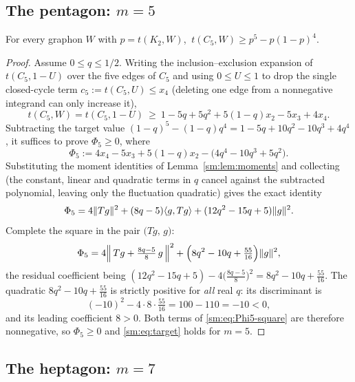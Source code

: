 \subsection{The pentagon: \texorpdfstring{$m=5$}{m=5}}\label{sm:sub:C5}

\begin{theorem}\label{sm:thm:C5}
For every graphon $W$ with $p=t(K_2,W)$,
$\ t(C_5,W)\ge p^{5}-p(1-p)^{4}.$
\end{theorem}

\begin{proof}
Assume $0\le q\le1/2$.  Writing the inclusion--exclusion expansion of
$t(C_5,1-U)$ over the five edges of $C_5$ and using $0\le U\le1$ to drop the
single closed-cycle term $c_5:=t(C_5,U)\le x_4$ (deleting one edge from a
nonnegative integrand can only increase it),
\[
   t(C_5,W)=t(C_5,1-U)
   \ \ge\ 1-5q+5q^{2}+5(1-q)x_2-5x_3+4x_4 .
\]
Subtracting the target value
$(1-q)^5-(1-q)q^4=1-5q+10q^{2}-10q^{3}+4q^{4}$, it suffices to prove
$\Phi_5\ge0$, where
\begin{equation}\label{sm:eq:Phi5}
   \Phi_5:=4x_4-5x_3+5(1-q)x_2-\bigl(4q^{4}-10q^{3}+5q^{2}\bigr).
\end{equation}
Substituting the moment identities of Lemma~\ref{sm:lem:moments} and
collecting (the constant, linear and quadratic terms in $q$ cancel against the
subtracted polynomial, leaving only the fluctuation quadratic) gives the exact
identity
\begin{equation}\label{sm:eq:Phi5-collected}
   \Phi_5=4\lVert Tg\rVert^{2}+(8q-5)\langle g,Tg\rangle+(12q^{2}-15q+5)\lVert g\rVert^{2}.
\end{equation}
Complete the square in the pair $\bigl(Tg,\,g\bigr)$:
\begin{equation}\label{sm:eq:Phi5-square}
   \Phi_5=4\Bigl\|\,Tg+\tfrac{8q-5}{8}\,g\,\Bigr\|^{2}
          +\Bigl(8q^{2}-10q+\tfrac{55}{16}\Bigr)\lVert g\rVert^{2},
\end{equation}
the residual coefficient being
$(12q^{2}-15q+5)-4\bigl(\tfrac{8q-5}{8}\bigr)^{2}
   =8q^{2}-10q+\tfrac{55}{16}$.
The quadratic $8q^{2}-10q+\tfrac{55}{16}$ is strictly positive for
\emph{all} real $q$: its discriminant is
\[
   (-10)^{2}-4\cdot 8\cdot\tfrac{55}{16}=100-110=-10<0,
\]
and its leading coefficient $8>0$.  Both terms of
\eqref{sm:eq:Phi5-square} are therefore nonnegative, so $\Phi_5\ge0$ and
\eqref{sm:eq:target} holds for $m=5$.
\end{proof}

\subsection{The heptagon: \texorpdfstring{$m=7$}{m=7}}\label{sm:sub:C7}

